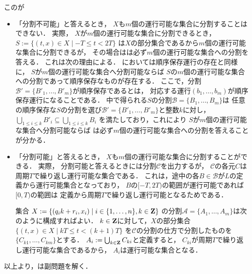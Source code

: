 この{\timeSpecifiedPatProbOnLineAlg}が
\begin{itemize}
  \item 「分割不可能」と答えるとき，
    $X$も$m$個の運行可能な集合に分割することはできない．
    実際，
    $X$が$m$個の運行可能な集合に分割できるとき，
    $S := \{ (t, x) \in X \mid -T \leq t < 2T \}$
    は$X$の部分集合であるから$m$個の運行可能な集合に分割できるが，
    その場合は{\timeSpecifiedPatProbOnLineAlg}は必ず$m$個の運行可能な集合への分割を答える．
    これは次の理由による．
    {\graphLine}においては順序保存運行の存在と同様に，
    $S$が$m$個の運行可能な集合へ分割可能ならば
    $S$の$m$個の運行可能な集合への分割であって順序保存なものが存在する．
    ここで，分割$\mathcal{B'} = \{ B'_1, \ldots, B'_m \}$が順序保存であるとは，
    対応する運行$(b_1, \ldots, b_m)$が順序保存運行になることである．
    {\timeSpecifiedPatProbOnLineAlg}中で得られる$S$の分割$\mathcal{B} = \{ B_1, \ldots, B_m \}$は
    任意の順序保存な$S$の分割を選び$\mathcal{B'} = \{ B'_1, \ldots, B'_m \}$と整数$k$に対し，
    $\bigcup_{1 \leq i \leq k} B'_i \subseteq \bigcup_{1 \leq i \leq k} B_i$
    を満たしており，これにより
    $S$が$m$個の運行可能な集合へ分割可能ならば
    {\timeSpecifiedPatProbOnLineAlg}は必ず$m$個の運行可能な集合への分割を答えることが分かる．
  \item 「分割可能」と答えるとき，
    $X$も$m$個の運行可能な集合に分割することができる．
    実際，
    分割可能と答えるときには分割$\mathcal{C}$を出力するが，
    $\mathcal{C}$の各元$C$は
    周期$T$で繰り返し運行可能な集合である．
    これは，途中の各$B \in \mathcal{B}$が$L$の定義から運行可能集合となっており，
    $B$の$[-T, 2T)$の範囲が運行可能であれば$[0, T)$の範囲は
    定義から周期$T$で繰り返し運行可能となるためである．

    集合
    $X := \{ (q_i k + r_i, x_i) \mid i \in \{1, \ldots, n\}, k \in \mathbf Z \}$
    の分割$\mathcal{A} = \{ A_1, \ldots, A_m \}$は次のように構成すればよい．
    $k \in \mathbf Z$に対して，$X$の部分集合
    $\{ (t, x) \in X \mid kT \leq t < (k + 1)T \}$
    を$\mathcal{C}$の分割の仕方で分割したものを$\{ C_{k1}, \ldots, C_{km} \}$とする．
    $A_i := \bigcup_{k \in \mathbf Z} C_{ki}$と定義すると，
    $C_{ki}$が周期$T$で繰り返し運行可能な集合であるから，
    $A_i$は運行可能な集合となる．
\end{itemize}
以上より，{\timeSpecifiedPatProbOnLineAlg}は副問題を解く．
